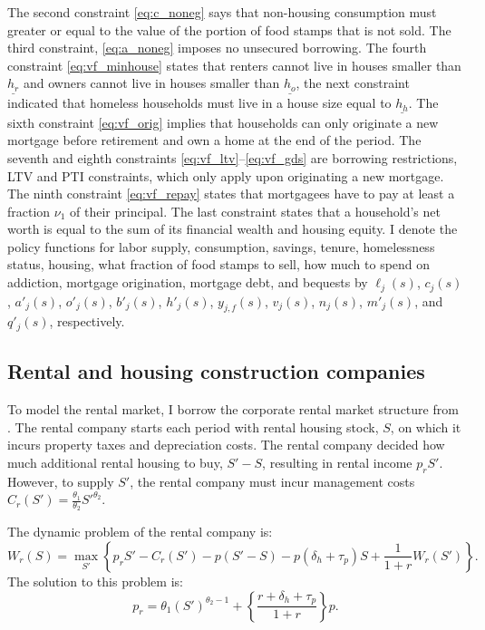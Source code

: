 \documentclass[parskip=full]{article}
\begin{document}
The second constraint \eqref{eq:c_noneg} says that non-housing consumption must greater or equal to the value of the portion of food stamps that is not sold. The third constraint, \eqref{eq:a_noneg} imposes no unsecured borrowing. The fourth constraint \eqref{eq:vf_minhouse} states that renters cannot live in houses smaller than $\underline{{h}_r}$ and owners cannot live in houses smaller than $\underline{{h}_o}$, the next constraint indicated that homeless households must live in a house size equal to $\underline{{h}_h}$. The sixth constraint \eqref{eq:vf_orig} implies that households can only originate a new mortgage before retirement and own a home at the end of the period. The seventh and eighth constraints \eqref{eq:vf_ltv}--\eqref{eq:vf_gds} are borrowing restrictions, LTV and PTI constraints, which only apply upon originating a new mortgage. The ninth constraint \eqref{eq:vf_repay} states that mortgagees have to pay at least a fraction $\nu_1$ of their principal. The last constraint states that a household's net worth is equal to the sum of its financial wealth and housing equity. I denote the policy functions for labor supply, consumption, savings, tenure, homelessness status, housing, what fraction of food stamps to sell, how much to spend on addiction, mortgage origination, mortgage debt, and bequests by $\ell_{j}(s)$, $c_{j}(s)$, $a'_{j}(s)$, $o'_{j}(s)$, $b'_{j}(s)$, $h'_{j}(s)$, $y_{j,f}(s)$, $v_{j}(s)$, $n_j(s)$, $m'_{j}(s)$, and $q'_j(s)$, respectively.

\subsection{Rental and housing construction companies}

To model the rental market, I borrow the corporate rental market structure from \citet{garrigaeetal-2009}. The rental company starts each period with rental housing stock, $S$, on which it incurs property taxes and depreciation costs. The rental company decided how much additional rental housing to buy, $S'-S$, resulting in rental income $p_{r} S'$. However, to supply $S'$, the rental company must incur management costs $C_r(S') = \frac{\theta_1}{\theta_2} S'^{\theta_2}$. 

The dynamic problem of the rental company is:
\begin{equation*}
W_r(S)=\max_{S'} \left\{p_{r}S' - C_r(S') - p (S'-S) - p(\delta_{h}+\tau_{p})S + \frac{1}{1+r}W_r(S')\right\}.
\end{equation*}
The solution to this problem is:
\begin{equation}
\label{eq:foc_rental}
p_{r} = \theta_1 (S')^{\theta_2-1}+\left\{\frac{r+\delta_{h}+\tau_p}{1+r}\right\}p.
\end{equation}
\end{document}
